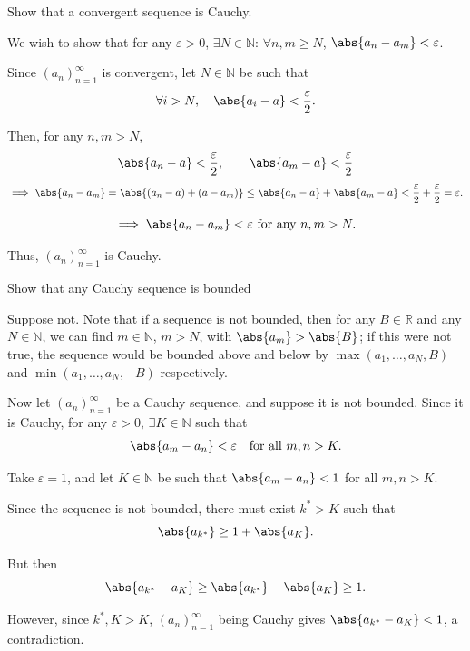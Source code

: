 \vspace{-1em}
\begin{exc}
\vspace{-1em}
\begin{exercise}
Show that a convergent sequence is Cauchy.
\end{exercise}
\begin{solution}
We wish to show that for any $\varepsilon > 0$, $\exists N \in \mathbb{N}$:
$\forall n,m \geq N$, $\abs{a_n - a_m} < \varepsilon$.

Since $(a_n)_{n=1}^{\infty}$ is convergent, let $N \in \mathbb{N}$ be such that
\[
\forall i > N,\quad \abs{a_i - a} < \frac{\varepsilon}{2}.
\]

Then, for any $n,m > N$,
\[
\abs{a_n - a} < \frac{\varepsilon}{2}, \qquad \abs{a_m - a} < \frac{\varepsilon}{2}
\]
\[
\implies \abs{a_n - a_m} = \abs{(a_n-a) + (a-a_m)} \leq \abs{a_n - a} + \abs{a_m - a}
< \frac{\varepsilon}{2} + \frac{\varepsilon}{2} = \varepsilon.
\]

\[
\implies \abs{a_n - a_m} < \varepsilon \text{ for any } n,m > N.
\]

Thus, $(a_n)_{n=1}^{\infty}$ is Cauchy.
\end{solution}

\begin{exercise}
Show that any Cauchy sequence is bounded
\label{exc:cauchy_bounded}
\end{exercise}

\begin{solution}
Suppose not. Note that if a sequence is not bounded, then for any $B \in
\mathbb{R}$ and any $N \in \mathbb{N}$, we can find $m \in \mathbb{N}$, $m > N$,
with $\abs{a_m} > \abs{B}$; if this were not true, the sequence would be bounded above
and below by $\max(a_1,\dots,a_N,B)$ and $\min(a_1,\dots,a_N,-B)$ respectively.

Now let $(a_n)_{n=1}^\infty$ be a Cauchy sequence, and suppose it is not
bounded. Since it is Cauchy, for any $\varepsilon > 0$, $\exists K \in \mathbb{N}$
such that
\[
\abs{a_m - a_n} < \varepsilon \quad \text{for all } m,n > K.
\]

Take $\varepsilon = 1$, and let $K \in \mathbb{N}$ be such that
$\abs{a_m - a_n} < 1$ for all $m,n > K$.

Since the sequence is not bounded, there must exist $k^* > K$ such that
\[
\abs{a_{k^*}} \geq 1 + \abs{a_K}.
\]

But then
\[
\abs{a_{k^*} - a_K} \geq \abs{a_{k^*}} - \abs{a_K} \geq 1.
\]

However, since $k^*, K > K$, $(a_n)_{n=1}^{\infty}$ being Cauchy gives
$\abs{a_{k^*} - a_K} < 1$, a contradiction.
\end{solution}
\end{exc}
